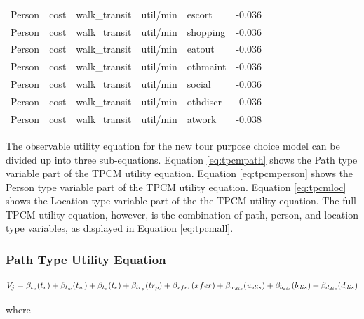 \documentclass[12pt, oneside, openright]{byuthesis}
\begin{document}
\begin{table}
\begin{tabular}[t]{lllllr}
Person & cost & walk\_transit & util/min & escort & -0.036\\
Person & cost & walk\_transit & util/min & shopping & -0.036\\
\addlinespace
Person & cost & walk\_transit & util/min & eatout & -0.036\\
Person & cost & walk\_transit & util/min & othmaint & -0.036\\
Person & cost & walk\_transit & util/min & social & -0.036\\
Person & cost & walk\_transit & util/min & othdiscr & -0.036\\
Person & cost & walk\_transit & util/min & atwork & -0.038\\
\bottomrule
\end{tabular}
\end{table}

The observable utility equation for the new tour purpose choice model can be divided up into three sub-equations. Equation \eqref{eq:tpcmpath} shows the Path type variable part of the TPCM utility equation. Equation \eqref{eq:tpcmperson} shows the Person type variable part of the TPCM utility equation. Equation \eqref{eq:tpcmloc} shows the Location type variable part of the the TPCM utility equation. The full TPCM utility equation, however, is the combination of path, person, and location type variables, as displayed in Equation \eqref{eq:tpcmall}.

\hypertarget{path-type-utility-equation}{%
\subsubsection{Path Type Utility Equation}\label{path-type-utility-equation}}

\begin{equation}
  V_j = \beta_{t_v}(t_v) + \beta_{t_w}(t_w) + \beta_{t_e}(t_e) + \beta_{tr_p}(tr_p) + \beta_{xfer}(xfer) + \beta_{w_{dis}}(w_{dis}) + \\ \beta_{b_{dis}}(b_{dis}) + \beta_{d_{dis}}(d_{dis}) \label{eq:tpcmpath}
\end{equation}

where
\end{document}

